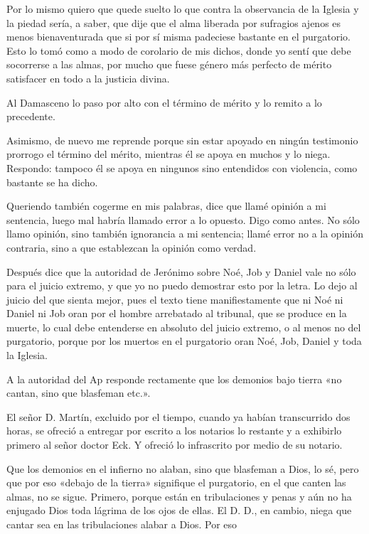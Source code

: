 Por lo mismo quiero que quede suelto lo que contra la observancia de la Iglesia y la piedad sería, a saber, que dije que el alma liberada por sufragios ajenos es menos bienaventurada que si por \marginpar{\small[341]} sí misma padeciese bastante en el purgatorio. Esto lo tomó como a modo de corolario de mis dichos, donde yo sentí que debe socorrerse a las almas, por mucho que fuese género más perfecto de mérito satisfacer en todo a la justicia divina.

Al Damasceno lo paso por alto con el término de mérito y lo remito a lo precedente.

Asimismo, de nuevo me reprende porque sin estar apoyado en ningún testimonio prorrogo el término del mérito, mientras él se apoya en muchos y lo niega. Respondo: tampoco él se apoya en ningunos sino entendidos con violencia, como bastante se ha dicho.

Queriendo también cogerme en mis palabras, dice que llamé opinión a mi sentencia, luego mal habría llamado error a lo opuesto. Digo como antes. No sólo llamo opinión, sino también ignorancia a mi sentencia; llamé error no a la opinión contraria, sino a que establezcan la opinión como verdad.

Después dice que la autoridad de Jerónimo sobre Noé, Job y Daniel vale no sólo para el juicio extremo, y que yo no puedo demostrar esto por la letra. Lo dejo al juicio del que sienta mejor, pues el texto tiene manifiestamente que ni Noé ni Daniel ni Job oran por el hombre arrebatado al tribunal, que se produce en la muerte, lo cual debe entenderse en absoluto del juicio extremo, o al menos no del purgatorio, porque por los muertos en el purgatorio oran Noé, Job, Daniel y toda la Iglesia.

A la autoridad del Ap responde rectamente que los demonios bajo tierra «no cantan, sino que blasfeman etc.».

El señor D. Martín, excluido por el tiempo, cuando ya habían transcurrido dos horas, se ofreció a entregar por escrito a los notarios lo restante y a exhibirlo primero al señor doctor Eck. Y ofreció lo infrascrito por medio de su notario.

Que los demonios en el infierno no alaban, sino que blasfeman a Dios, lo sé, pero que por eso «debajo de la tierra» signifique el purgatorio, en el que canten las almas, no se sigue. Primero, porque están en tribulaciones y penas y aún no ha enjugado Dios toda lágrima de los ojos de ellas. El D. D., en cambio, niega que cantar sea en las tribulaciones alabar a Dios. Por eso

